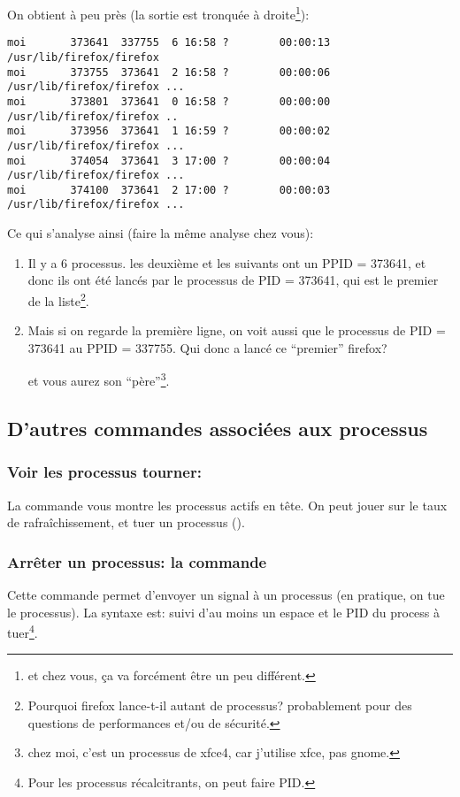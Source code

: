{\begin{itemize}
  On obtient à peu près (la sortie est tronquée à droite\footnote{et chez
    vous, ça va forcément être un peu différent.}):
\begin{verbatim}
moi       373641  337755  6 16:58 ?        00:00:13 /usr/lib/firefox/firefox
moi       373755  373641  2 16:58 ?        00:00:06 /usr/lib/firefox/firefox ...
moi       373801  373641  0 16:58 ?        00:00:00 /usr/lib/firefox/firefox ..
moi       373956  373641  1 16:59 ?        00:00:02 /usr/lib/firefox/firefox ...
moi       374054  373641  3 17:00 ?        00:00:04 /usr/lib/firefox/firefox ...
moi       374100  373641  2 17:00 ?        00:00:03 /usr/lib/firefox/firefox ...
\end{verbatim}
Ce qui s'analyse ainsi (faire la même analyse chez vous):
\begin{enumerate}
\item Il y a 6 processus. les deuxième et les suivants ont un PPID =
  373641, et donc ils ont été lancés par le processus de PID = 373641,
  qui est le premier de la liste\footnote{Pourquoi firefox lance-t-il autant
  de processus? probablement pour des questions de performances et/ou
   de sécurité.}.
\item Mais si on regarde la première ligne, on voit aussi que le
  processus de PID = 373641 au PPID = 337755. Qui donc a lancé ce
  ``premier'' firefox?


 et vous aurez son ``père''\footnote{chez moi, c'est un processus de xfce4, car
 j'utilise xfce, pas gnome.}.
\end{enumerate}
\end{itemize}

  }
  
\subsection{D'autres commandes associées aux processus}
\subsubsection{Voir les processus tourner:}
La commande  vous montre les processus actifs en tête. On
peut jouer sur 
le taux de rafraîchissement, et tuer un processus ().

\subsubsection{Arrêter un processus: la commande }
Cette commande permet d'envoyer un signal à un processus (en pratique,
on tue le processus). La syntaxe est:  suivi d'au moins un
espace et le PID du process à tuer\footnote{Pour les processus
  récalcitrants, on peut faire  PID.}.

